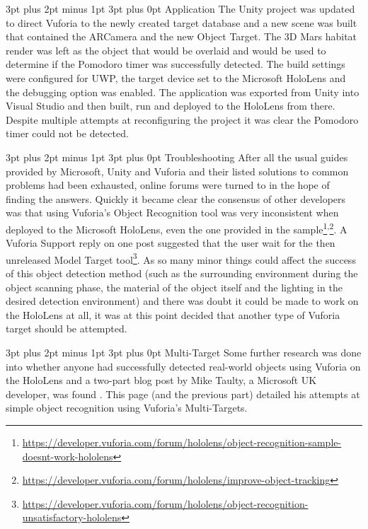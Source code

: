 \documentclass[12pt,a4paper,oneside]{article}
\makeatletter
\renewcommand\paragraph{\@startsection {paragraph}{1}{0mm} %
	                           {3pt plus 2pt minus 1pt} %
	                           {3pt plus 0pt} %
	                           {\normalfont}}
\renewcommand\subsubsection{\@startsection {subsubsection}{1}{0mm} %
	                           {3pt plus 2pt minus 1pt} %
	                           {3pt plus 0pt} %
	                           {\normalfont\bfseries}}
\makeatother
\begin{document}
\paragraph{Application}
The Unity project was updated to direct Vuforia to the newly created target database and a new scene was built that contained the ARCamera and the new Object Target. The 3D Mars habitat render was left as the object that would be overlaid and would be used to determine if the Pomodoro timer was successfully detected. The build settings were configured for UWP, the target device set to the Microsoft HoloLens and the debugging option was enabled. The application was exported from Unity into Visual Studio and then built, run and deployed to the HoloLens from there. Despite multiple attempts at reconfiguring the project it was clear the Pomodoro timer could not be detected.

\paragraph{Troubleshooting}
After all the usual guides provided by Microsoft, Unity and Vuforia and their listed solutions to common problems had been exhausted, online forums were turned to in the hope of finding the answers. Quickly it became clear the consensus of other developers was that using Vuforia's Object Recognition tool was very inconsistent when deployed to the Microsoft HoloLens, even the one provided in the sample\footnote{\url{https://developer.vuforia.com/forum/hololens/object-recognition-sample-doesnt-work-hololens}}\textsuperscript{,}\footnote{\url{https://developer.vuforia.com/forum/hololens/improve-object-tracking}}. A Vuforia Support reply on one post suggested that the user wait for the then unreleased Model Target tool\footnote{\url{https://developer.vuforia.com/forum/hololens/object-recognition-unsatisfactory-hololens}}. As so many minor things could affect the success of this object detection method (such as the surrounding environment during the object scanning phase, the material of the object itself and the lighting in the desired detection environment) and there was doubt it could be made to work on the HoloLens at all, it was at this point decided that another type of Vuforia target should be attempted.

\subsubsection{Multi-Target}
Some further research was done into whether anyone had successfully detected real-world objects using Vuforia on the HoloLens and a two-part blog post by Mike Taulty, a Microsoft UK developer, was found \cite{taulty16}. This page (and the previous part) detailed his attempts at simple object recognition using Vuforia's Multi-Targets.
\end{document}
